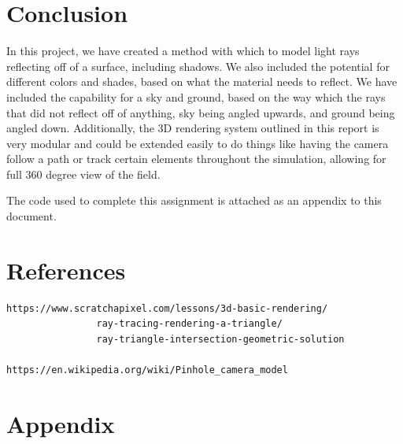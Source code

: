\documentclass{article}
\begin{document}
\section{Conclusion}
In this project, we have created a method with which to model light rays reflecting off of a surface, including shadows. We also
included the potential for different colors and shades, based on what the material needs to reflect. We have included the capability
for a sky and ground, based on the way which the rays that did not reflect off of anything, sky being angled upwards, and ground
being angled down. Additionally, the 3D rendering system outlined in this report is very modular and could be extended easily to
do things like having the camera follow a path or track certain elements throughout the simulation, allowing for full 360 degree
view of the field.

The code used to complete this assignment is attached as an appendix to this document.

\section{References}
\begin{lstlisting}
https://www.scratchapixel.com/lessons/3d-basic-rendering/
                ray-tracing-rendering-a-triangle/
                ray-triangle-intersection-geometric-solution

https://en.wikipedia.org/wiki/Pinhole_camera_model
\end{lstlisting}

\newpage
\onecolumn
\section{Appendix}







\end{document}
